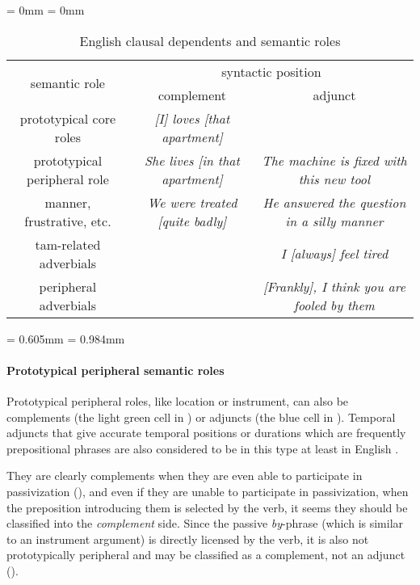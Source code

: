 \documentclass[UTF8, a4paper, oneside, scheme=plain, 12pt]{ctexbook}
\newcommand*{\citesec}[1]{\S~{#1}}
\newcommand*{\term}[1]{\emph{#1}}
\newcommand{\form}[1]{\emph{#1}}
\newcommand{\midsepremove}{\aboverulesep = 0mm \belowrulesep = 0mm}
\newcommand{\midsepdefault}{\aboverulesep = 0.605mm \belowrulesep = 0.984mm}
\begin{document}
\begin{table}[H]
    \caption{English clausal dependents and semantic roles}
    \label{tbl:clausal-dependent}
    \midsepremove
    \centering
    {\footnotesize
    \begin{tabular}{ccc}
    \toprule
    \multirow{2}{*}{semantic role}      & \multicolumn{2}{c}{syntactic position}                                                       \\ \cmidrule{2-3}
                                  & complement                             & adjunct                                             \\ \midrule
    prototypical core roles       & \cellcolor[HTML]{32CB00}\form{[I] loves [that apartment]}             & \\ 
    prototypical peripheral role  & \cellcolor[HTML]{34FF34}\form{She lives [in that apartment]} & \cellcolor[HTML]{34CDF9}\form{The machine is fixed with this new tool}    \\
    manner, frustrative, etc.     & \cellcolor[HTML]{DAE8FC}\cellcolor[HTML]{67FD9A}\form{We were treated [quite badly]} & \cellcolor[HTML]{DAE8FC}\form{He answered the question in a silly manner} \\
    \cmidrule{1-3}
    \acs{tam}-related adverbials &                                        & \cellcolor[HTML]{ECF4FF}\form{I [always] feel tired}                      \\ \cmidrule{1-3}
    peripheral adverbials  &                                        & \form{[Frankly], I think you are fooled by them} \\ \bottomrule
    \end{tabular}}
    \midsepdefault
\end{table}

\paragraph*{Prototypical peripheral semantic roles}
Prototypical peripheral roles, like location or instrument, can also be complements 
(the light green cell in )
or adjuncts
(the blue cell in ).
Temporal adjuncts that give accurate temporal positions or durations 
which are frequently prepositional phrases 
are also considered to be in this type at least in English
\citep[\citesec{1.5}]{cinque1999adverbs}. 

They are clearly complements when they are even able to participate in passivization 
(), 
and even if they are unable to participate in passivization, 
when the preposition introducing them is selected by the verb, 
it seems they should be classified into the \term{complement} side.
Since the passive \form{by}-phrase (which is similar to an instrument argument) 
is directly licensed by the verb,
it is also not prototypically peripheral and may be classified as a complement, not an adjunct
().
\end{document}
